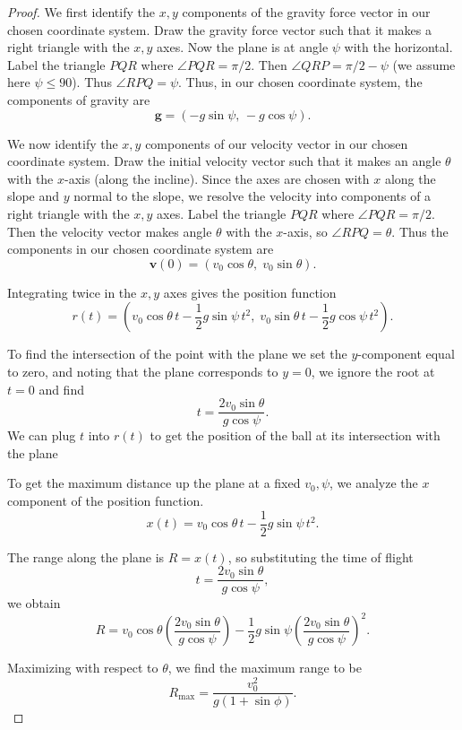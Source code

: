 \begin{proof}
    We first identify the $x, y$ components of the gravity force vector in our chosen coordinate system.
    Draw the gravity force vector such that it makes a right triangle with the $x, y$ axes.
    Now the plane is at angle $\psi$ with the horizontal.
    Label the triangle $P Q R$ where $\angle PQR = \pi / 2$.
    Then $\angle Q R P = \pi / 2 - \psi$ (we assume here $\psi \le 90$).
    Thus $\angle R P Q = \psi$.
    Thus, in our chosen coordinate system, the components of gravity are
    \[
    \mathbf{g} = (-g \sin \psi,\,-g \cos \psi).
    \]

    We now identify the $x, y$ components of our velocity vector in our chosen coordinate system.
    Draw the initial velocity vector such that it makes an angle $\theta$ with the $x$-axis (along the incline).
    Since the axes are chosen with $x$ along the slope and $y$ normal to the slope, 
    we resolve the velocity into components of a right triangle with the $x, y$ axes.
    Label the triangle $PQR$ where $\angle PQR = \pi/2$.
    Then the velocity vector makes angle $\theta$ with the $x$-axis, so $\angle RPQ = \theta$.
    Thus the components in our chosen coordinate system are
    \[
    \mathbf{v}(0) = (v_0 \cos\theta,\; v_0 \sin\theta).
    \]

    Integrating twice in the $x, y$ axes gives the position function
    \[
    r(t) = \left(v_0 \cos \theta \, t - \frac{1}{2} g \sin \psi \, t^2,\; 
    v_0 \sin \theta \, t - \frac{1}{2} g \cos \psi \, t^2\right).
    \]

    To find the intersection of the point with the plane we set the $y$-component equal to zero,
    and noting that the plane corresponds to $y=0$, we ignore the root at $t = 0$ and find
    \[
    t = \frac{2 v_0 \sin \theta}{g \cos \psi}.
    \]
    We can plug $t$ into $r(t)$ to get the position of the ball at its intersection with the plane

    To get the maximum distance up the plane at a fixed $v_0, \psi$,
    we analyze the $x$ component of the position function.
    \[
    x(t) = v_0 \cos \theta \, t - \frac{1}{2} g \sin \psi \, t^2.
    \]

    The range along the plane is $R = x(t)$, so substituting the time of flight
    \[
    t = \frac{2 v_0 \sin \theta}{g \cos \psi},
    \]
    we obtain
    \[
    R = v_0 \cos \theta \left(\frac{2 v_0 \sin \theta}{g \cos \psi}\right)
    - \frac{1}{2} g \sin \psi \left(\frac{2 v_0 \sin \theta}{g \cos \psi}\right)^2.
    \]

    Maximizing with respect to $\theta$, we find the maximum range to be
    \[
    R_{\max} = \frac{v_0^2}{g(1 + \sin \phi)}.
    \]
\end{proof}

